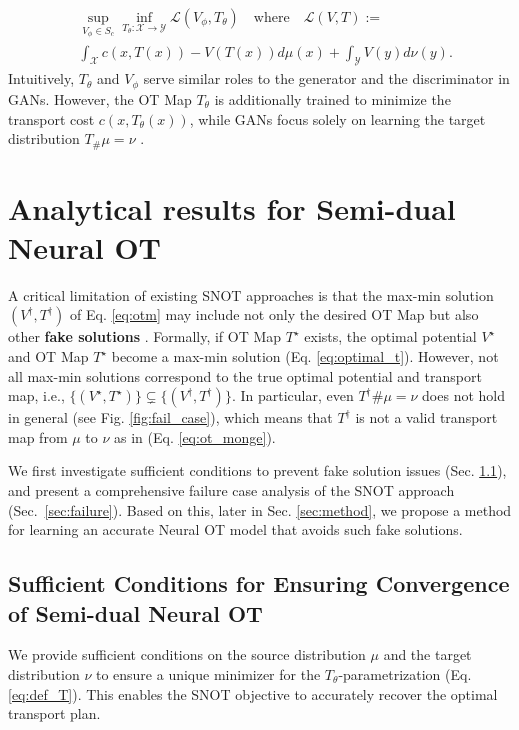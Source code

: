 \begin{equation}  \label{eq:otm}
    \begin{aligned}
        &\sup_{V_{\phi} \in S_c} \inf_{T_{\theta}:\mathcal{X} \rightarrow \mathcal{Y}} 
        \mathcal{L}(V_{\phi}, T_{\theta}) \quad \text{where} \quad \mathcal{L}(V, T) := \\
        & \int_{\mathcal{X}} c\left(x,T(x)\right)-V \left( T(x) \right) d\mu(x) + \int_{\mathcal{Y}} V(y)  d\nu(y).
    \end{aligned}    
\end{equation}
Intuitively, $T_\theta$ and $V_\phi$ serve similar roles to the generator and the discriminator in GANs. However, the OT Map $T_\theta$ is additionally trained to minimize the transport cost $c\left(x, T_{\theta}(x)\right)$, while GANs focus solely on learning the target distribution $T_{\#}\mu = \nu$ \citep{wgan, wgan-gp}. 


\section{Analytical results for Semi-dual Neural OT} 
\label{sec:analyze}


A critical limitation of existing SNOT approaches is that the max-min solution $(V^{\dagger}, T^{\dagger})$ of Eq. \ref{eq:otm} may include not only the desired OT Map but also other \textbf{fake solutions} \citep{otm}. Formally, if OT Map $T^\star$ exists, the optimal potential $V^\star$ and OT Map $T^\star$ become a max-min solution (Eq. \ref{eq:optimal_t}). 
However, not all max-min solutions correspond to the true optimal potential and transport map, i.e., $\{(V^{\star}, T^{\star})\} \subsetneq \{(V^{\dagger}, T^{\dagger})\} $. In particular, even $T^{\dagger} \# \mu = \nu$ does not hold in general (see Fig. \ref{fig:fail_case}), which means that $T^{\dagger}$ is not a valid transport map from $\mu$ to $\nu$ as in (Eq. \ref{eq:ot_monge}).

We first investigate sufficient conditions to prevent fake solution issues (Sec. \ref{sec:unique_saddle}), and present a comprehensive failure case analysis of the SNOT approach (Sec.~\ref{sec:failure}). Based on this, later in Sec. \ref{sec:method}, we propose a method for learning an accurate Neural OT model that avoids such fake solutions.

\subsection{Sufficient Conditions for Ensuring Convergence of Semi-dual Neural OT}
\label{sec:unique_saddle}
We provide sufficient conditions on the source distribution $\mu$ and the target distribution $\nu$ to ensure a unique minimizer for the $T_{\theta}$-parametrization (Eq. \ref{eq:def_T}). This enables the SNOT objective to accurately recover the optimal transport plan. %

